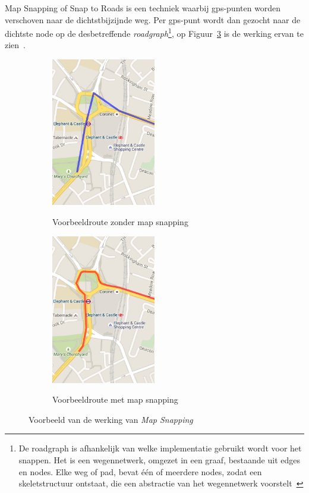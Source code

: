 Map Snapping of Snap to Roads is een techniek waarbij \ac{gps}-punten worden
verschoven naar de dichtstbijzijnde weg. Per \ac{gps}-punt wordt dan gezocht
naar de dichtste node op de desbetreffende \textit{roadgraph}\footnote{De
    roadgraph is afhankelijk van welke implementatie gebruikt wordt voor het
    snappen. Het is een wegennetwerk, omgezet in een graaf, bestaande uit edges en
    nodes. Elke weg of pad, bevat één of meerdere nodes, zodat een skeletstructuur
    ontstaat, die een abstractie van het wegennetwerk
    voorstelt~\cite{seiler2022haul}}, op Figuur~\ref{fig:MapSnapping} is de werking
ervan te zien~\cite{Snapping96:online}.
\begin{figure}[h]
    \centering
    \begin{subfigure}[b]{.5\textwidth}
        \centering
        \caption{Voorbeeldroute zonder map snapping}
        \includegraphics[width=0.5\textwidth]{fig/Map Snapping/before.png}\label{fig:before_MapSnapping}
    \end{subfigure}\hfill
    \begin{subfigure}[b]{.5\textwidth}
        \centering
        \caption{Voorbeeldroute met map snapping}
        \includegraphics[width=0.5\textwidth]{fig/Map Snapping/after.png}\label{fig:after_MapSnapping}
    \end{subfigure}
    \caption{Voorbeeld van de werking van \textit{Map Snapping}~\cite{Snapping96:online}}\label{fig:MapSnapping}
\end{figure}

